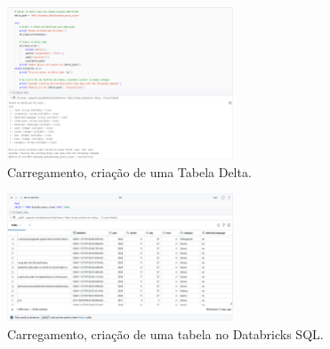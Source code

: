 \documentclass[
  letterpaper,
  DIV=11,
  numbers=noendperiod]{scrartcl}
\begin{document}
\begin{figure}[htbp]
    \centering
    \includegraphics[width=0.6\textwidth]{evidencias/evidencia7.png}
    \caption{Carregamento, criação de uma Tabela Delta.}
    \label{fig:exemplo}
\end{figure}

\begin{figure}[htbp]
    \centering
    \includegraphics[width=0.6\textwidth]{evidencias/evidencia8.png}
    \caption{Carregamento, criação de uma tabela no Databricks SQL.}
    \label{fig:exemplo}
\end{figure}


\printindex
\end{document}
